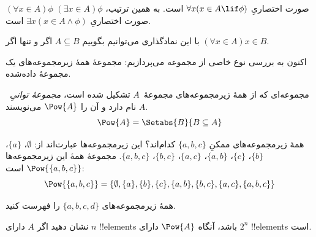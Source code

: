 \documentclass[../../../include/open-logic-section]{subfiles}
\begin{document}
\begin{defn}
$(\forall x \in A)\phi$ صورت اختصاریِ $\forall x(x \in A \lif
\phi)$ است. به همین ترتیب، $(\exists x \in A)\phi$ صورت اختصاریِ
$\exists x(x \in A \land \phi)$ است.
\end{defn}

با این نمادگذاری می‌توانیم بگوییم $A \subseteq B$ اگر و تنها اگر
$(\forall x \in A)x \in B$.

اکنون به بررسی نوع خاصی از مجموعه می‌پردازیم: مجموعهٔ همهٔ
زیرمجموعه‌های یک مجموعهٔ داده‌شده.

\begin{defn}
مجموعه‌ای که از همهٔ زیرمجموعه‌های مجموعهٔ~$A$ تشکیل شده است،
\emph{مجموعهٔ توانیِ}~$A$ نام دارد و آن را $\Pow{A}$ می‌نویسند.
  \[
    \Pow{A} = \Setabs{B}{B \subseteq A}
  \]
\end{defn}

\begin{ex}
همهٔ زیرمجموعه‌های ممکنِ $\{ a, b, c \}$ کدام‌اند؟ این زیرمجموعه‌ها
عبارت‌اند از: $\emptyset$، $\{a \}$، $\{b\}$، $\{c\}$، $\{a, b\}$،
$\{a, c\}$، $\{b,
c\}$، $\{a, b, c\}$. مجموعهٔ همهٔ این زیرمجموعه‌ها
$\Pow{\{a,b,c\}}$ است:
\[
\Pow{\{ a, b, c \}} = \{\emptyset, \{a \}, \{b\}, \{c\}, \{a, b\},
\{b, c\}, \{a, c\}, \{a, b, c\}\}
\]
\end{ex}

\begin{prob}
همهٔ زیرمجموعه‌های $\{a, b, c, d\}$ را فهرست کنید.
\end{prob}

\begin{prob}
نشان دهید اگر $A$ دارای $n$ !!{element}s باشد، آنگاه $\Pow{A}$ دارای
$2^n$ !!{element}s است.
\end{prob}
\end{document}

